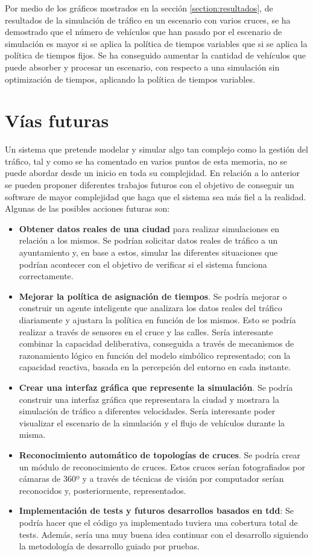 Por medio de los gráficos mostrados en la sección \ref{section:resultados}, de resultados de la simulación de tráfico en un escenario con varios cruces, se ha demostrado que el número de vehículos que han pasado por el escenario de simulación es mayor si se aplica la política de tiempos variables que si se aplica la política de tiempos fijos. Se ha conseguido aumentar la cantidad de vehículos que puede absorber y procesar un escenario, con respecto a una simulación sin optimización de tiempos, aplicando la política de tiempos variables.


\chapter{Vías futuras}
    \label{chap:nine}
Un sistema que pretende modelar y simular algo tan complejo como la gestión del tráfico, tal y como se ha comentado en varios puntos de esta memoria, no se puede abordar desde un inicio en toda su complejidad. En relación a lo anterior se pueden proponer diferentes trabajos futuros con el objetivo de conseguir un software de mayor complejidad que haga que el sistema sea más fiel a la realidad. Algunas de las posibles acciones futuras son:
\begin{itemize}
    \item\textbf{Obtener datos reales de una ciudad} para realizar simulaciones en relación a los mismos. Se podrían solicitar datos reales de tráfico a un ayuntamiento y, en base a estos, simular las diferentes situaciones que podrían acontecer con el objetivo de verificar si el sistema funciona correctamente.
    \item \textbf{Mejorar la política de asignación de tiempos}. Se podría mejorar o construir un agente inteligente que analizara los datos reales del tráfico diariamente y ajustara la política en función de los mismos. Esto se podría realizar a través de sensores en el cruce y las calles. Sería interesante combinar la capacidad deliberativa, conseguida a través de mecanismos de razonamiento lógico en función del modelo simbólico representado; con la capacidad reactiva, basada en la percepción del entorno en cada instante.
    \item \textbf{Crear una interfaz gráfica que represente la simulación}. Se podría construir una interfaz gráfica que representara la ciudad y mostrara la simulación de tráfico a diferentes velocidades. Sería interesante poder visualizar el escenario de la simulación y el flujo de vehículos durante la misma.
    \item \textbf{Reconocimiento automático de topologías de cruces}. Se podría crear un módulo de reconocimiento de cruces. Estos cruces serían fotografiados por cámaras de 360º y a través de técnicas de visión por computador serían reconocidos y, posteriormente, representados.
    \item \textbf{Implementación de tests y futuros desarrollos basados en \acrshort{tdd}}: Se podría hacer que el código ya implementado tuviera una cobertura total de tests. Además, sería una muy buena idea continuar con el desarrollo siguiendo la metodología de desarrollo guiado por pruebas.
\end{itemize}
